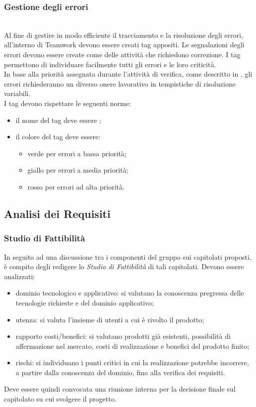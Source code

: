 \subsubsection{Gestione degli errori} \mbox{} \\
Al fine di gestire in modo efficiente il tracciamento e la risoluzione degli errori, all'interno di Teamwork devono essere creati tag appositi.
Le segnalazioni degli errori devono essere create come  delle attività che richiedono correzione. I tag permettono di individuare facilmente tutti gli errori e le loro criticità.\\
In base alla priorità assegnata durante l'attività di verifica, come descritto in \PianoDiQualifica, gli errori richiederanno un diverso onere lavorativo in tempistiche di risoluzione variabili.\\
I tag devono rispettare le seguenti norme:
\begin{itemize}
	\item il nome del tag deve essere ;
	\item il colore del tag deve essere:
	\begin{itemize}
		\item verde per errori a bassa priorità;
		\item giallo per errori a media priorità;
		\item rosso per errori ad alta priorità.
	\end{itemize}
\end{itemize}

\subsection{Analisi dei Requisiti}
\subsubsection{Studio di Fattibilità}
In seguito ad una discussione tra i componenti del gruppo sui capitolati proposti, è compito degli \Analisti{} redigere lo \textit{Studio di Fattibilità} di tali capitolati. Devono essere analizzati:
\begin{itemize}
	\item dominio tecnologico e applicativo: si valutano la conoscenza pregressa delle tecnologie richieste e del dominio applicativo;
	\item utenza: si valuta l'insieme di utenti a cui è rivolto il prodotto;
	\item rapporto costi/benefici: si valutano prodotti già esistenti, possibilità di affermazione nel mercato, costi di realizzazione e benefici del prodotto finito;
	\item rischi: si individuano i punti critici in cui la realizzazione potrebbe incorrere, a partire dalla conoscenza del dominio, fino alla verifica dei requisiti.
\end{itemize}
Deve essere quindi convocata una riunione interna per la decisione finale sul capitolato su cui svolgere il progetto.

